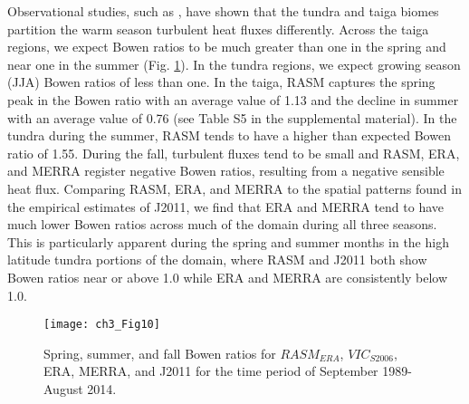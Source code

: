 Observational studies, such as \citet{Beringer_2005}, have shown that the tundra and taiga biomes partition the warm season turbulent heat fluxes differently.
Across the taiga regions, we expect Bowen ratios to be much greater than one in the spring and near one in the summer (Fig. \ref{fig:bowen}).
In the tundra regions, we expect growing season (JJA) Bowen ratios of less than one.
In the taiga, RASM captures the spring peak in the Bowen ratio with an average value of 1.13 and the decline in summer with an average value of 0.76 (see Table S5 in the supplemental material).
In the tundra during the summer, RASM tends to have a higher than expected Bowen ratio of 1.55.
During the fall, turbulent fluxes tend to be small and RASM, ERA, and MERRA register negative Bowen ratios, resulting from a negative sensible heat flux.
Comparing RASM, ERA, and MERRA to the spatial patterns found in the empirical estimates of J2011, we find that ERA and MERRA tend to have much lower Bowen ratios across much of the domain during all three seasons.
This is particularly apparent during the spring and summer months in the high latitude tundra portions of the domain, where RASM and J2011 both show Bowen ratios near or above 1.0 while ERA and MERRA are consistently below 1.0.

\begin{figure}
  \centering
  \texttt{[image: ch3\_Fig10]}
  \caption{Spring, summer, and fall Bowen ratios for $RASM_{ERA}$, $VIC_{S2006}$, ERA, MERRA, and J2011 for the time period of September 1989-August 2014.}
  \label{fig:bowen}
\end{figure}

